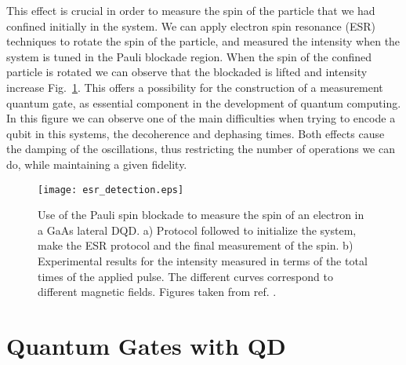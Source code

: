 This effect is crucial in order to measure the spin of the particle that we had confined initially in the system. We can apply electron spin resonance (ESR) techniques to rotate the spin of the particle, and measured the intensity when the system  is tuned in the Pauli blockade region. When the spin of the confined particle is rotated we can observe that the blockaded is lifted and intensity increase Fig.~\ref{fig:esr_detection}. This offers a possibility for the construction of a measurement quantum gate, as essential component in the development of quantum computing. In this figure we can observe one of the main difficulties when trying to encode a qubit in this systems, the decoherence and dephasing times. Both effects cause the damping  of the oscillations, thus restricting the number of operations we can do, while maintaining a given fidelity.
\begin{figure}[!htb]
	\centering
	\texttt{[image: esr\_detection.eps]}
	\caption{Use of the Pauli spin blockade to measure the spin of an electron in a GaAs lateral DQD. a) Protocol followed to initialize the system, make the ESR protocol and the final measurement of the spin. b) Experimental results for the intensity measured in terms of the total times of the applied pulse. The different curves correspond to different magnetic fields. Figures taken from ref. \cite{Koppens2006}.}
	\label{fig:esr_detection}
\end{figure}

\section{Quantum Gates with QD}

